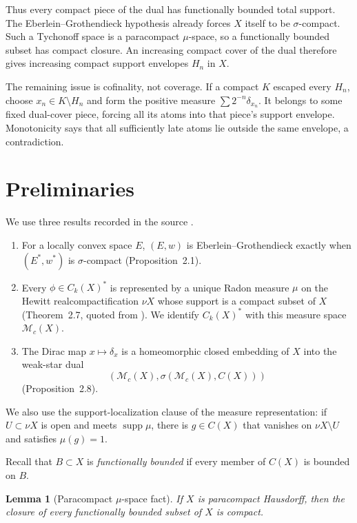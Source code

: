 \documentclass[11pt]{article}
\newtheorem{lemma}[theorem]{Lemma}
\newcommand{\supp}{\operatorname{supp}}
\newcommand{\Mc}{\mathcal M_c}
\begin{document}
Thus every compact piece of the dual has functionally bounded total support.
The Eberlein--Grothendieck hypothesis already forces $X$ itself to be
$\sigma$-compact.  Such a Tychonoff space is a paracompact $\mu$-space, so a
functionally bounded subset has compact closure.  An increasing compact cover
of the dual therefore gives increasing compact support envelopes $H_n$ in
$X$.

The remaining issue is cofinality, not coverage.  If a compact $K$ escaped
every $H_n$, choose $x_n\in K\setminus H_n$ and form the positive measure
$\sum 2^{-n}\delta_{x_n}$.  It belongs to some fixed dual-cover piece, forcing
all its atoms into that piece's support envelope.  Monotonicity says that all
sufficiently late atoms lie outside the same envelope, a contradiction.

\section{Preliminaries}

We use three results recorded in the source \cite{source}.

\begin{enumerate}
\item For a locally convex space $E$, $(E,w)$ is
Eberlein--Grothendieck exactly when $(E^*,w^*)$ is $\sigma$-compact
(Proposition~2.1).
\item Every $\phi\in C_k(X)^*$ is represented by a unique Radon measure
$\mu$ on the Hewitt realcompactification $\nu X$ whose support is a compact
subset of $X$ (Theorem~2.7, quoted from \cite{schmets}).  We identify
$C_k(X)^*$ with this measure space $\Mc(X)$.
\item The Dirac map $x\mapsto\delta_x$ is a homeomorphic closed embedding of
$X$ into the weak-star dual
\[
 (\Mc(X),\sigma(\Mc(X),C(X)))
\]
(Proposition~2.8).
\end{enumerate}

We also use the support-localization clause of the measure representation:
if $U\subset\nu X$ is open and meets $\supp\mu$, there is $g\in C(X)$ that
vanishes on $\nu X\setminus U$ and satisfies $\mu(g)=1$.

Recall that $B\subset X$ is \emph{functionally bounded} if every member of
$C(X)$ is bounded on $B$.

\begin{lemma}[Paracompact $\mu$-space fact]\label{lem:mu-space}
If $X$ is paracompact Hausdorff, then the closure of every functionally
bounded subset of $X$ is compact.
\end{lemma}
\end{document}
